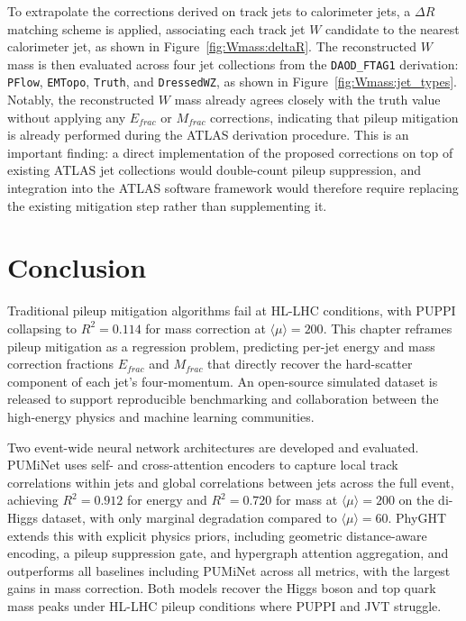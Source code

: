 To extrapolate the corrections derived on track jets to calorimeter jets, a $\Delta R$ matching scheme is applied, associating each track jet $W$ candidate to the nearest calorimeter jet, as shown in Figure~\ref{fig:Wmass:deltaR}.
The reconstructed $W$ mass is then evaluated across four jet collections from the \texttt{DAOD\_FTAG1} derivation: \texttt{PFlow}, \texttt{EMTopo}, \texttt{Truth}, and \texttt{DressedWZ}, as shown in Figure~\ref{fig:Wmass:jet_types}.
Notably, the reconstructed $W$ mass already agrees closely with the truth value without applying any $E_{frac}$ or $M_{frac}$ corrections, indicating that pileup mitigation is already performed during the ATLAS derivation procedure.
This is an important finding: a direct implementation of the proposed corrections on top of existing ATLAS jet collections would double-count pileup suppression, and integration into the ATLAS software framework would therefore require replacing the existing mitigation step rather than supplementing it.

\section{Conclusion}

Traditional pileup mitigation algorithms fail at HL-LHC conditions, with PUPPI collapsing to $R^2=0.114$ for mass correction at $\langle\mu\rangle=200$.
This chapter reframes pileup mitigation as a regression problem, predicting per-jet energy and mass correction fractions $E_{frac}$ and $M_{frac}$ that directly recover the hard-scatter component of each jet's four-momentum.
An open-source simulated dataset is released to support reproducible benchmarking and collaboration between the high-energy physics and machine learning communities.

Two event-wide neural network architectures are developed and evaluated.
PUMiNet uses self- and cross-attention encoders to capture local track correlations within jets and global correlations between jets across the full event, achieving $R^2=0.912$ for energy and $R^2=0.720$ for mass at $\langle\mu\rangle=200$ on the di-Higgs dataset, with only marginal degradation compared to $\langle\mu\rangle=60$.
PhyGHT extends this with explicit physics priors, including geometric distance-aware encoding, a pileup suppression gate, and hypergraph attention aggregation, and outperforms all baselines including PUMiNet across all metrics, with the largest gains in mass correction.
Both models recover the Higgs boson and top quark mass peaks under HL-LHC pileup conditions where PUPPI and JVT struggle.

